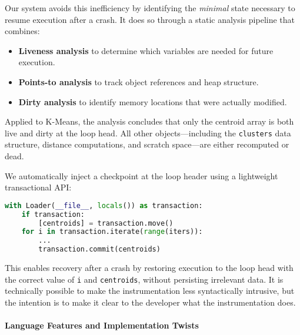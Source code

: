 Our system avoids this inefficiency by identifying the \emph{minimal} state necessary to resume execution after a crash. It does so through a static analysis pipeline that combines:
\begin{itemize}
    \item \textbf{Liveness analysis} to determine which variables are needed for future execution.
    \item \textbf{Points-to analysis} to track object references and heap structure.
    \item \textbf{Dirty analysis} to identify memory locations that were actually modified.
\end{itemize}
Applied to K-Means, the analysis concludes that only the centroid array is both live and dirty at the loop head. All other objects---including the \texttt{clusters} data structure, distance computations, and scratch space---are either recomputed or dead.

We automatically inject a checkpoint at the loop header using a lightweight transactional API:
\begin{lstlisting}[language=python]
with Loader(__file__, locals()) as transaction:
    if transaction:
        [centroids] = transaction.move()
    for i in transaction.iterate(range(iters)):
        ...
        transaction.commit(centroids)
\end{lstlisting}
This enables recovery after a crash by restoring execution to the loop head with the correct value of \texttt{i} and \texttt{centroids}, without persisting irrelevant data. It is technically possible to make the instrumentation less syntactically intrusive, but the intention is to make it clear to the developer what the instrumentation does.

\paragraph{Language Features and Implementation Twists}

